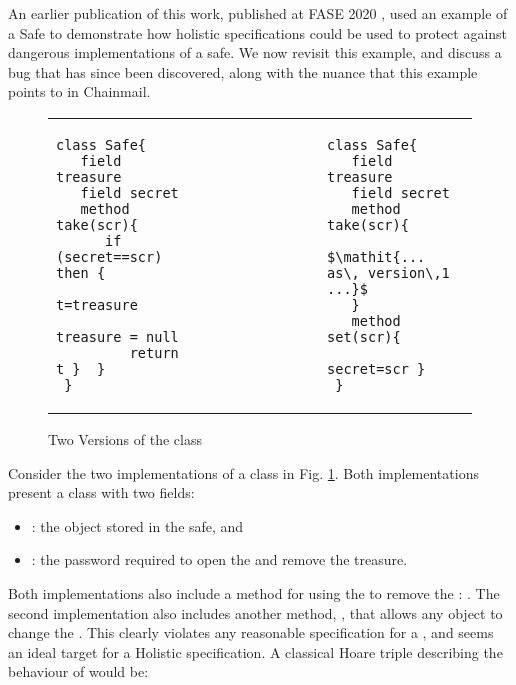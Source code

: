 An earlier publication of this work, published at FASE 2020 \cite{FASE}, used an example of a Safe to
demonstrate how holistic specifications could be used to protect against dangerous implementations
of a safe. We now revisit this example, and discuss a bug that has since been discovered, along with
the nuance that this example points to in Chainmail. 

 \begin{figure}[htb]
 \begin{tabular}{lll} %
\begin{minipage}{0.45\textwidth}
\begin{lstlisting}
class Safe{
   field treasure 
   field secret 
   method take(scr){
      if (secret==scr) then {
         t=treasure
         treasure = null
         return t }  }
 }
\end{lstlisting}
\end{minipage}
  &\ \ \  \ \ \ \ \  \ \ \ \ \ \ &
\begin{minipage}{0.45\textwidth}
\begin{lstlisting}
class Safe{
   field treasure   
   field secret  
   method take(scr){
       $\mathit{... as\, version\,1 ...}$ 
   }
   method set(scr){
         secret=scr }
 }
\end{lstlisting}
\end{minipage} 
 \end{tabular}
  \vspace*{-0.95cm}
  \caption{Two Versions of the class }
 \label{fig:ExampleSafe}
 \vspace*{-0.4cm}
 \end{figure}

Consider the two implementations of a  class in Fig. \ref{fig:ExampleSafe}. Both implementations 
present a class with two fields:
\begin{itemize}
\item
{} : the object stored in the safe,  and 
\item
{} : the password required to open the  and remove the treasure.
\end{itemize}
Both implementations also include a method for using the 
  to remove the : .
The second implementation also includes another method, , that allows any object to change the .
This clearly violates any reasonable specification for a , and seems an ideal target for a Holistic specification.
 A classical Hoare triple describing the behaviour of  would be:
 
